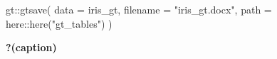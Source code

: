 \documentclass[
]{article}
\newenvironment{Shaded}{\begin{snugshade}}{\end{snugshade}}
\newcommand{\AttributeTok}[1]{\textcolor[rgb]{0.40,0.45,0.13}{#1}}
\newcommand{\FunctionTok}[1]{\textcolor[rgb]{0.28,0.35,0.67}{#1}}
\newcommand{\NormalTok}[1]{\textcolor[rgb]{0.00,0.23,0.31}{#1}}
\newcommand{\SpecialCharTok}[1]{\textcolor[rgb]{0.37,0.37,0.37}{#1}}
\newcommand{\StringTok}[1]{\textcolor[rgb]{0.13,0.47,0.30}{#1}}
\begin{document}
\begin{Shaded}
\begin{Highlighting}[]
\NormalTok{gt}\SpecialCharTok{::}\FunctionTok{gtsave}\NormalTok{(}
  \AttributeTok{data =}\NormalTok{ iris\_gt,}
  \AttributeTok{filename =} \StringTok{"iris\_gt.docx"}\NormalTok{,}
  \AttributeTok{path =}\NormalTok{ here}\SpecialCharTok{::}\FunctionTok{here}\NormalTok{(}\StringTok{"gt\_tables"}\NormalTok{)}
\NormalTok{  )}
\end{Highlighting}
\end{Shaded}

\begin{table}

\caption{\textbf{?(caption)}}

\end{table}
\end{document}
